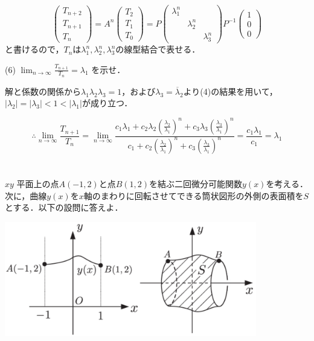 \documentclass[a4j]{jarticle}
\let \ds \displaystyle
\begin{document}
$$\begin{pmatrix} T_{n+2} \\ T_{n+1} \\ T_{n} \end{pmatrix} = A^n \begin{pmatrix} T_2 \\ T_1 \\ T_0 \end{pmatrix} = P \begin{pmatrix} \lambda_1^n & & \\ & \lambda_2^n & \\ & & \lambda_3^n \end{pmatrix}P^{-1}\begin{pmatrix} 1 \\ 0 \\ 0 \end{pmatrix}$$
と書けるので，$T_n$は$\lambda_1^n,\lambda_2^n,\lambda_3^n$の線型結合で表せる．

\begin{screen}
 (6) $\ds \lim_{n \rightarrow \infty} \frac{T_{n+1}}{T_n} = \lambda_1$ を示せ．
\end{screen}

解と係数の関係から$\lambda_1\lambda_2\lambda_3=1$，および$\lambda_3=\overline{\lambda}_2$より(4)の結果を用いて，$|\lambda_2|=|\lambda_3|<1<|\lambda_1|$が成り立つ．

$$\therefore \lim_{n \rightarrow \infty}\frac{T_{n+1}}{T_n}=\lim_{n \rightarrow \infty}\frac{c_1\lambda_1+c_2\lambda_2\left(\ds\frac{\lambda_2}{\lambda_1}\right)^n+c_3\lambda_3\left(\ds\frac{\lambda_3}{\lambda_1}\right)^n}{c_1+c_2\left(\ds\frac{\lambda_2}{\lambda_1}\right)^n+c_3\left(\ds\frac{\lambda_3}{\lambda_1}\right)^n}=\frac{c_1\lambda_1}{c_1}=\lambda_1$$

\section{}

\begin{screen}
 $xy$ 平面上の点$A(-1,2)$と点$B(1,2)$を結ぶ二回微分可能関数$y(x)$を考える．次に，曲線$y(x)$を$x$軸のまわりに回転させてできる筒状図形の外側の表面積を$S$とする．以下の設問に答えよ．
 
 \centering\includegraphics[width=11cm]{figure_2016_01.png}
\end{screen}
\end{document}
